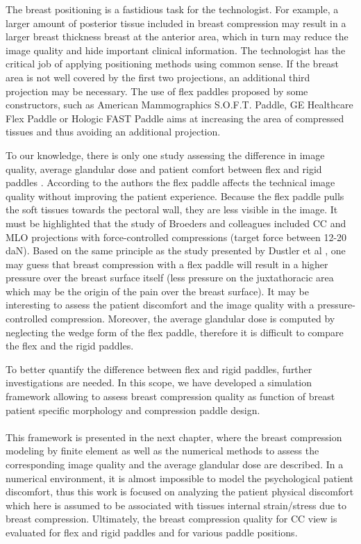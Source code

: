 The breast positioning is a fastidious task for the technologist. For example, a larger amount of posterior tissue included in breast compression may result in a larger breast thickness breast at the anterior area, which in turn may reduce the image quality and hide important clinical information. The technologist has the critical job of applying positioning methods using common sense. If the breast area is not well covered by the first two projections, an additional third projection may be necessary. The use of flex paddles proposed by some constructors, such as American Mammographics S.O.F.T. Paddle, GE Healthcare Flex Paddle or Hologic FAST Paddle aims at increasing the area of compressed tissues and thus avoiding an additional projection.

To our knowledge, there is only one study assessing the difference in image quality, average glandular dose and patient comfort between flex and rigid paddles \citep{broeders_comparison_2015}. According to the authors the flex paddle affects the technical image quality without improving the patient experience.  Because the flex paddle pulls the soft tissues towards the pectoral wall, they are less visible in the image. It must be highlighted that the study of Broeders and colleagues included CC and MLO projections with force-controlled compressions (target force between 12-20 daN). Based on the same principle as the study presented by Dustler et al \cite{dustler_effect_2012}, one may guess that breast compression with a flex paddle will result in a higher pressure over the breast surface itself (less pressure on the juxtathoracic area which may be the origin of the pain over the breast surface). It may be interesting to assess the patient discomfort and the image quality with a pressure-controlled compression. Moreover, the average glandular dose is computed by neglecting the wedge form of the flex paddle, therefore it is difficult to compare the flex and the rigid paddles.  

To better quantify the difference between flex and rigid paddles, further investigations are needed.  In this scope, we have developed a simulation framework allowing to assess breast compression quality as function of breast patient specific morphology and compression paddle design.\\
\\


This framework is presented in the next chapter, where the breast compression modeling by finite element as well as the numerical methods to assess the corresponding image quality and the average glandular dose are described. In a numerical environment, it is almost impossible to model the psychological patient discomfort, thus this work is focused on analyzing the patient physical discomfort which here is assumed to be associated with tissues internal strain/stress due to breast compression. Ultimately, the breast compression quality for CC view is evaluated for flex and rigid paddles and for various paddle positions.

